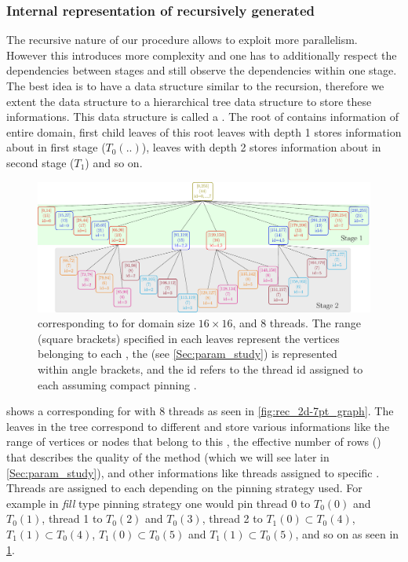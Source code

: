 	\subsubsection{Internal representation of recursively generated \boldmath{\levelGroups}} \label{subsec:level_tree}
	The recursive nature of our procedure allows to exploit more parallelism. However this introduces more complexity and one has to additionally respect the dependencies between stages and still observe the dependencies within one stage. The best idea is to have a data structure similar to the recursion, therefore we extent the \levelPtr data structure to a hierarchical tree data structure to store these informations. This data structure is called a \levelTree. The root of \levelTree contains information of entire domain, first child leaves of this root \ie leaves with depth 1 stores information about \levelGroups in first stage ($T_0(..)$), leaves with depth 2 stores information about \levelGroups in second stage ($T_1$) and so on. 
	
	 \begin{figure}[thbp]
		 \includegraphics[width=\textwidth, height=0.2\textheight]{pics/recursion/2d-7pt_example/tree/tree}
	 	\caption{\levelTree corresponding to \stex for domain size $16 \times 16$, and 8 threads. The range (square brackets) specified in each leaves represent the vertices belonging to each \levelGroup, the \nrowsEff (see \cref{Sec:param_study}) is represented within angle brackets, and the id refers to the thread id assigned to each \levelGroups assuming compact pinning .}
	 	\label{fig:rec_2d-7pt_tree}
	 \end{figure}

 
  shows a \levelTree corresponding for \stex  with 8 threads as seen in \cref{fig:rec_2d-7pt_graph}. The leaves in the tree correspond to different \levelGroups and store various informations like the range of vertices or nodes that belong to this \levelGroup, the effective number of rows (\nrowsEff) that describes the quality of the method (which we will see later in \cref{Sec:param_study}), and other informations like threads assigned to specific \levelGroups.  Threads are assigned to each \levelGroup depending on the pinning strategy used. For example in \emph{fill} type pinning strategy one would pin thread 0 to $T_0(0)$ and $T_0(1)$, thread 1 to $T_0(2)$ and $T_0(3)$, thread 2 to $T_1(0)  \subset T_0(4)$, $T_1(1) \subset T_0(4)$, $T_1(0)  \subset T_0(5)$ and $T_1(1) \subset T_0(5)$, and so on as seen in \cref{fig:rec_2d-7pt_tree}. 
 
